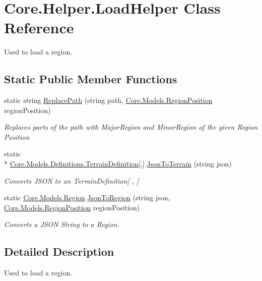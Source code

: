 \hypertarget{classCore_1_1Helper_1_1LoadHelper}{\section{Core.\-Helper.\-Load\-Helper Class Reference}
\label{classCore_1_1Helper_1_1LoadHelper}
}


Used to load a region.  


\subsection*{Static Public Member Functions}
\begin{DoxyCompactItemize}
\item 
static string \hyperlink{classCore_1_1Helper_1_1LoadHelper_a640d07c856bb1e1b8e8e17666c9cadea}{Replace\-Path} (string path, \hyperlink{classCore_1_1Models_1_1RegionPosition}{Core.\-Models.\-Region\-Position} region\-Position)
\begin{DoxyCompactList}\small\item\em Replaces parts of the path with Major\-Region and Minor\-Region of the given Region Position \end{DoxyCompactList}\item 
static \\*
\hyperlink{classCore_1_1Models_1_1Definitions_1_1TerrainDefinition}{Core.\-Models.\-Definitions.\-Terrain\-Definition}\mbox{[},\mbox{]} \hyperlink{classCore_1_1Helper_1_1LoadHelper_a6f20b66dcc8ab52e25f09d0cdc7ebfcd}{Json\-To\-Terrain} (string json)
\begin{DoxyCompactList}\small\item\em Converts J\-S\-O\-N to an Terrain\-Definition\mbox{[} , \mbox{]} \end{DoxyCompactList}\item 
static \hyperlink{classCore_1_1Models_1_1Region}{Core.\-Models.\-Region} \hyperlink{classCore_1_1Helper_1_1LoadHelper_ace39477d290680fce596cf46869b92b6}{Json\-To\-Region} (string json, \hyperlink{classCore_1_1Models_1_1RegionPosition}{Core.\-Models.\-Region\-Position} region\-Position)
\begin{DoxyCompactList}\small\item\em Converts a J\-S\-O\-N String to a Region. \end{DoxyCompactList}\end{DoxyCompactItemize}


\subsection{Detailed Description}
Used to load a region. 



